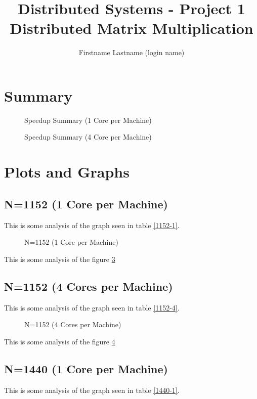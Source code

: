 \documentclass[a4paper]{article}
\title{Distributed Systems - Project 1 \\ Distributed Matrix Multiplication}
\author{Firstname Lastname (login name)}
\begin{document}
\maketitle

\section{Summary}

\begin{figure}
    
    \caption{Speedup Summary (1 Core per Machine)}
    \label{fig:speedup_no_cores}
\end{figure}

\begin{figure}
    
    \caption{Speedup Summary (4 Core per Machine)}
    \label{fig:speedup_cores}
\end{figure}

\section{Plots and Graphs}

\subsection{N=1152 (1 Core per Machine)}

This is some analysis of the graph seen in table \ref{1152-1}.

\begin{figure}
    
    \caption{N=1152 (1 Core per Machine)}
    \label{fig:1152_1}
\end{figure}

This is some analysis of the figure \ref{fig:1152_1}

\subsection{N=1152 (4 Cores per Machine)}

This is some analysis of the graph seen in table \ref{1152-4}.

\begin{figure}
    
    \caption{N=1152 (4 Cores per Machine)}
    \label{fig:1152_4}
\end{figure}

This is some analysis of the figure \ref{fig:1152_4}

\subsection{N=1440 (1 Core per Machine)}

This is some analysis of the graph seen in table \ref{1440-1}.
\end{document}
